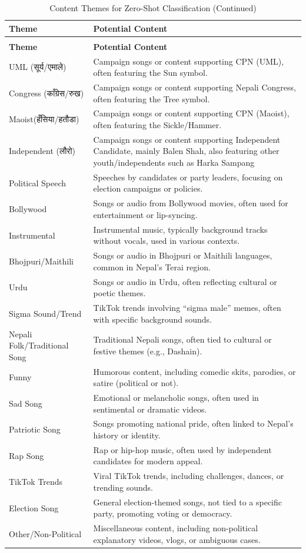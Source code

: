 \documentclass[12pt,a4paper]{report}
\begin{document}
\begin{longtable}{@{} p{5cm} p{10cm} @{}}
\caption{Content Themes for Zero-Shot Classification} \label{tab:content_themes} \\
\toprule
\textbf{Theme} & \textbf{Potential Content} \\
\midrule
\endfirsthead
\caption[]{Content Themes for Zero-Shot Classification (Continued)} \\
\toprule
\textbf{Theme} & \textbf{Potential Content} \\
\midrule
\endhead
\small
UML (\texthindi{सूर्य/एमाले}) & Campaign songs or content supporting CPN (UML), often featuring the Sun symbol. \\
Congress (\texthindi{काँग्रेस/रुख}) & Campaign songs or content supporting Nepali Congress, often featuring the Tree symbol. \\
Maoist(\texthindi{हँसिया/हतौडा}) & Campaign songs or content supporting CPN (Maoist), often featuring the Sickle/Hammer. \\
Independent (\texthindi{लौरो}) & Campaign songs or content supporting Independent Candidate, mainly Balen Shah, also featuring other youth/independents such as Harka Sampang\\

Political Speech & Speeches by candidates or party leaders, focusing on election campaigns or policies. \\
Bollywood & Songs or audio from Bollywood movies, often used for entertainment or lip-syncing. \\
Instrumental & Instrumental music, typically background tracks without vocals, used in various contexts. \\
Bhojpuri/Maithili & Songs or audio in Bhojpuri or Maithili languages, common in Nepal’s Terai region. \\
Urdu & Songs or audio in Urdu, often reflecting cultural or poetic themes. \\
Sigma Sound/Trend & TikTok trends involving ``sigma male'' memes, often with specific background sounds. \\
Nepali Folk/Traditional Song & Traditional Nepali songs, often tied to cultural or festive themes (e.g., Dashain). \\
Funny & Humorous content, including comedic skits, parodies, or satire (political or not). \\
Sad Song & Emotional or melancholic songs, often used in sentimental or dramatic videos. \\
Patriotic Song & Songs promoting national pride, often linked to Nepal’s history or identity. \\
Rap Song & Rap or hip-hop music, often used by independent candidates for modern appeal. \\
TikTok Trends & Viral TikTok trends, including challenges, dances, or trending sounds. \\
Election Song & General election-themed songs, not tied to a specific party, promoting voting or democracy. \\
Other/Non-Political & Miscellaneous content, including non-political explanatory videos, vlogs, or ambiguous cases. \\
\bottomrule
\end{longtable}
\end{document}
